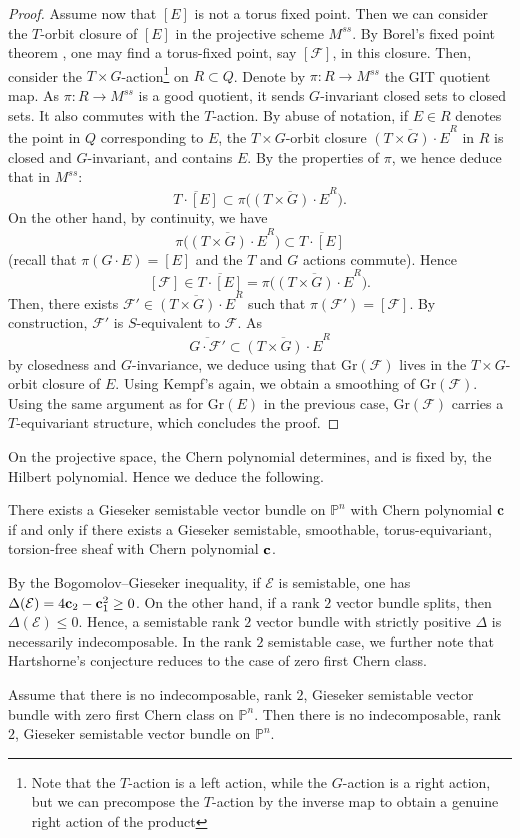 \documentclass[a4paper,10pt]{amsart}
\theoremstyle{plain}{
    \newtheorem{theorem}{Theorem}[section]
    \newtheorem{lemma}[theorem]{Lemma}
    \newtheorem{corollary}[theorem]{Corollary}
    \newtheorem{proposition}[theorem]{Proposition}
    \newtheorem{conjecture}[theorem]{Conjecture}
}
\theoremstyle{definition}{
    \newtheorem{definition}[theorem]{Definition}
    \newtheorem{defn-thm}[theorem]{Definition-Theorem}
    \newtheorem{example}[theorem]{Example}
    \newtheorem{notation}[theorem]{Notation}
}
\theoremstyle{remark}{
    \newtheorem{remark}[theorem]{Remark}
    \newtheorem{problem}[theorem]{Problem}
    \newtheorem{question}[theorem]{Question}
}
\def\uc{{\bf c}}
\def\cF{\mathcal{F}}
\def\cE{\mathcal{E}}
\def\P{\mathbb{P}}
\def\Gr{\mathrm{Gr}}
\begin{document}
\begin{proof}
 Assume now that $[E]$ is not a torus fixed point. Then we can consider the $T$-orbit closure of $[E]$ in the projective scheme $M^{ss}$. By Borel's fixed point theorem \cite[Proposition 15.5]{Borel}, one may find a torus-fixed point, say $[\cF]$, in this closure.  Then, consider the $T\times G$-action\footnote{Note that the $T$-action is a left action, while the $G$-action is a right action, but we can precompose the $T$-action by the inverse map to obtain a genuine right action of the product} on $R\subset Q$.  Denote by $\pi:R\to M^{ss}$ the GIT quotient map. As $\pi:R\to M^{ss}$ is a good quotient, it sends $G$-invariant closed sets to closed sets. It also commutes with the $T$-action. By abuse of notation, if $E\in R$ denotes the point in $Q$ corresponding to $E$, the $T\times G$-orbit closure   $\overline{(T\times G)\cdot E}^R$ in $R$ is closed and $G$-invariant, and contains $E$.  By the properties of $\pi$, we hence deduce that in $M^{ss}$:
 \[
 \overline{T\cdot [E]}\subset \pi\big(\overline{(T\times G)\cdot E}^{R}\big).
 \]
 On the other hand, by continuity, we have
\[
 \pi\big(\overline{(T\times G)\cdot E}^{R}\big)\subset \overline{T\cdot [E]}
 \] 
 (recall that $\pi(G\cdot E)=[E]$ and the $T$ and $G$ actions commute).  Hence \[
 [\cF]\in\overline{T\cdot [E]} =\pi\big(\overline{(T\times G)\cdot E}^{R}\big).
 \]
 Then, there exists $\cF'\in \overline{(T\times G)\cdot E}^{R}$ such that $\pi(\cF')=[\cF]$. By construction, $\cF'$ is $S$-equivalent to $\cF$. As 
 \[
  \overline{G\cdot\cF'}\subset \overline{(T\times G)\cdot E}^{R}
 \]
 by closedness and $G$-invariance, we deduce using \cite[theorem 4.3.3]{HuLe} that $\Gr(\cF)$ lives in the $T\times G$-orbit closure of $E$. Using Kempf's \cite[Theorem 1.4]{Kempf78} again, we obtain a smoothing of $\Gr(\cF)$. Using the same argument as for $\Gr(E)$ in the previous case, $\Gr(\cF)$ carries a $T$-equivariant structure, which concludes the proof.
\end{proof}
On the projective space, the Chern polynomial determines, and is fixed by, the Hilbert polynomial. Hence we deduce the following.
\begin{corollary}
 \label{cor:existence reduction projective space}
 There exists a Gieseker semistable vector bundle on $\P^n$ with Chern polynomial $\uc$ if and only if there exists a Gieseker semistable, smoothable, torus-equivariant, torsion-free sheaf with Chern polynomial $\uc$.
\end{corollary}
By the Bogomolov--Gieseker inequality, if $\cE$ is semistable, one has $\Delta(\cE)=4\uc_2-\uc_1^2\geq 0$. On the other hand, if a rank $2$ vector bundle splits, then $\Delta(\cE)\leq 0$. Hence, a semistable rank $2$ vector bundle with strictly positive $\Delta$ is necessarily indecomposable. In the rank $2$ semistable case, we further note that Hartshorne's conjecture  reduces to the case of zero first Chern class.
\begin{proposition}
 \label{prop:reduction even case}
 Assume that there is no indecomposable, rank $2$, Gieseker semistable vector bundle with zero first Chern class on $\P^n$. Then there is no indecomposable, rank $2$, Gieseker semistable vector bundle on $\P^n$.
\end{proposition}
\end{document}
